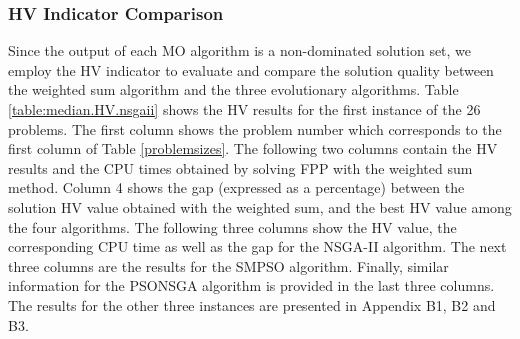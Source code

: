 \documentclass[10pt,journal,compsoc]{IEEEtran}
\begin{document}
\subsubsection{HV Indicator Comparison}
Since the output of each MO algorithm is a non-dominated solution set, we employ the HV indicator \cite{Auger:2009:THI:1527125.1527138} to evaluate and compare the solution quality between the weighted sum algorithm and the three evolutionary algorithms. 
\iffalse
Table \ref{table:median.HV.nsgaii} shows the HV results for the first instance of the 26 problems. The first column shows the problem number which corresponds to the first column of Table \ref{problemsizes}. The following two columns contain the HV results and the CPU times obtained by solving FPP with the weighted sum method. Column 4 shows the gap (expressed as a percentage) between the solution HV value obtained with the weighted sum, and the best HV value among the four algorithms. The following three columns show the HV value, the corresponding CPU time as well as the gap for the NSGA-II algorithm. The next three columns are the results for the SMPSO algorithm. Finally, similar information for the PSONSGA algorithm is provided in the last three columns. The results for the other three instances are presented in Appendix B1, B2 and B3.
\end{document}

